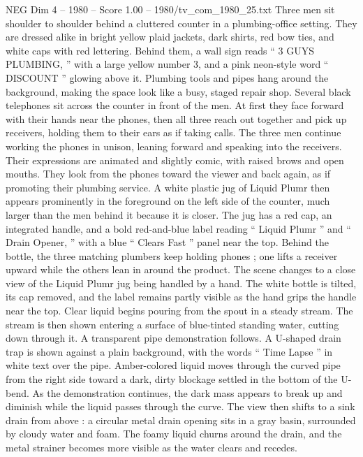 \begin{textsample}{NEG Dim 4 – 1980 – Score 1.00 – 1980/tv\_com\_1980\_25.txt}  \label{ex:f4_neg_058}
Three men sit shoulder to shoulder behind a cluttered counter in a plumbing-office setting.
They are dressed alike in bright yellow plaid jackets, dark shirts, red bow ties, and white caps with red lettering.
Behind them, a wall sign reads “ 3 GUYS PLUMBING, ” with a large yellow number 3, and a pink neon-style word “ DISCOUNT ” glowing above it.
Plumbing tools and pipes hang around the background, making the space look like a busy, staged repair shop.
Several black telephones sit across the counter in front of the men.
At first they face forward with their hands near the phones, then all three reach out together and pick up receivers, holding them to their ears as if taking calls.
The three men continue working the phones in unison, leaning forward and speaking into the receivers.
Their expressions are animated and slightly comic, with raised brows and open mouths.
They look from the phones toward the viewer and back again, as if promoting their plumbing service.
A white plastic jug of Liquid Plumr then appears prominently in the foreground on the left side of the counter, much larger than the men behind it because it is closer.
The jug has a red cap, an integrated handle, and a bold red-and-blue label reading “ Liquid Plumr ” and “ Drain Opener, ” with a blue “ Clears Fast ” panel near the top.
Behind the bottle, the three matching plumbers keep holding phones ; one lifts a receiver upward while the others lean in around the product.
The scene changes to a close view of the Liquid Plumr jug being handled by a hand.
The white bottle is tilted, its cap removed, and the label remains partly visible as the hand grips the handle near the top.
Clear liquid begins pouring from the spout in a steady stream.
The stream is then shown entering a surface of blue-tinted standing water, cutting down through it.
A transparent pipe demonstration follows.
A U-shaped drain trap is shown against a plain background, with the words “ Time Lapse ” in white text over the pipe.
Amber-colored liquid moves through the curved pipe from the right side toward a dark, dirty blockage settled in the bottom of the U-bend.
As the demonstration continues, the dark mass appears to break up and diminish while the liquid passes through the curve.
The view then shifts to a sink drain from above : a circular metal drain opening sits in a gray basin, surrounded by cloudy water and foam.
The foamy liquid churns around the drain, and the metal strainer becomes more visible as the water clears and recedes.

\end{textsample}
